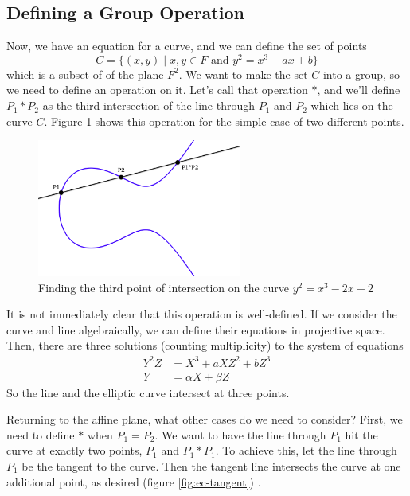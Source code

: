 \documentclass{article}
\begin{document}
\subsection{Defining a Group Operation}
Now, we have an equation for a curve, and we can define the set of points 
$$C = \{(x,y) \mid x,y \in F \text{ and } y^2 = x^3 + ax + b\}$$
which is a subset of of the plane $F^2$.
We want to make the set $C$ into a group, so we need to define an operation on it.
Let's call that operation $*$, and we'll define $P_1 * P_2$ as the third intersection of the line through $P_1$ and $P_2$ which lies on the curve $C$.
Figure \ref{fig:ec-3rd-intersection} shows this operation for the simple case of two different points.

\begin{figure}[h]
\centering
\includegraphics[width=0.6\textwidth]{images/ec4-star.png}
\caption{Finding the third point of intersection on the curve $y^2 = x^3 - 2x + 2$}
\label{fig:ec-3rd-intersection}
\end{figure}

It is not immediately clear that this operation is well-defined.
If we consider the curve and line algebraically, we can define their equations in projective space.
Then, there are three solutions (counting multiplicity) to the system of equations
\begin{align*}
Y^2Z &= X^3 + aXZ^2 + bZ^3 \\
Y &= \alpha X + \beta Z
\end{align*}
So the line and the elliptic curve intersect at three points.

Returning to the affine plane, what other cases do we need to consider?
First, we need to define $*$ when $P_1 = P_2$.
We want to have the line through $P_1$ hit the curve at exactly two points, $P_1$ and $P_1*P_1$.
To achieve this, let the line through $P_1$ be the tangent to the curve.
Then the tangent line intersects the curve at one additional point, as desired (figure \ref{fig:ec-tangent}) \cite[$\S$I.2]{rational-points}.
\end{document}
